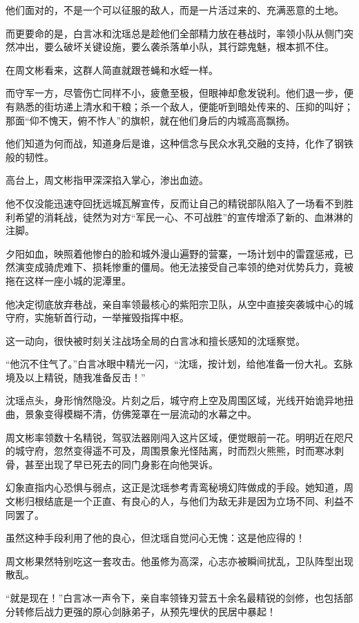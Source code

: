 他们面对的，不是一个可以征服的敌人，而是一片活过来的、充满恶意的土地。

而更要命的是，白言冰和沈瑶总是趁他们全部精力放在巷战时，率领小队从侧门突然冲出，要么破坏关键设施，要么袭杀落单小队，其行踪鬼魅，根本抓不住。

在周文彬看来，这群人简直就跟苍蝇和水蛭一样。

而守军一方，尽管伤亡同样不小，疲惫至极，但眼神却愈发锐利。他们退一步，便有熟悉的街坊递上清水和干粮；杀一个敌人，便能听到暗处传来的、压抑的叫好；那面“仰不愧天，俯不怍人”的旗帜，就在他们身后的内城高高飘扬。

他们知道为何而战，知道身后是谁，这种信念与民众水乳交融的支持，化作了钢铁般的韧性。

\vspace{2em}

高台上，周文彬指甲深深掐入掌心，渗出血迹。

他不仅没能迅速夺回抚远城瓦解宣传，反而让自己的精锐部队陷入了一场看不到胜利希望的消耗战，徒然为对方“军民一心、不可战胜”的宣传增添了新的、血淋淋的注脚。

夕阳如血，映照着他惨白的脸和城外漫山遍野的营寨，一场计划中的雷霆惩戒，已然演变成骑虎难下、损耗惨重的僵局。他无法接受自己率领的绝对优势兵力，竟被拖在这样一座小城的泥潭里。

他决定彻底放弃巷战，亲自率领最核心的紫阳宗卫队，从空中直接突袭城中心的城守府，实施斩首行动，一举摧毁指挥中枢。

这一动向，很快被时刻关注战场全局的白言冰和擅长感知的沈瑶察觉。

“他沉不住气了。”白言冰眼中精光一闪，“沈瑶，按计划，给他准备一份大礼。玄脉境及以上精锐，随我准备反击！”

沈瑶点头，身形悄然隐没。片刻之后，城守府上空及周围区域，光线开始诡异地扭曲，景象变得模糊不清，仿佛笼罩在一层流动的水幕之中。

周文彬率领数十名精锐，驾驭法器刚闯入这片区域，便觉眼前一花。明明近在咫尺的城守府，忽然变得遥不可及，周围景象光怪陆离，时而烈火熊熊，时而寒冰刺骨，甚至出现了早已死去的同门身影在向他哭诉。

幻象直指内心恐惧与弱点，这正是沈瑶参考青鸾秘境幻阵做成的手段。她知道，周文彬归根结底是一个正直、有良心的人，与他们为敌无非是因为立场不同、利益不同罢了。

虽然这种手段利用了他的良心，但沈瑶自觉问心无愧：这是他应得的！

周文彬果然特别吃这一套攻击。他虽修为高深，心志亦被瞬间扰乱，卫队阵型出现散乱。

“就是现在！”白言冰一声令下，亲自率领锋刃营五十余名最精锐的剑修，也包括部分转修后战力更强的原心剑脉弟子，从预先埋伏的民居中暴起！

